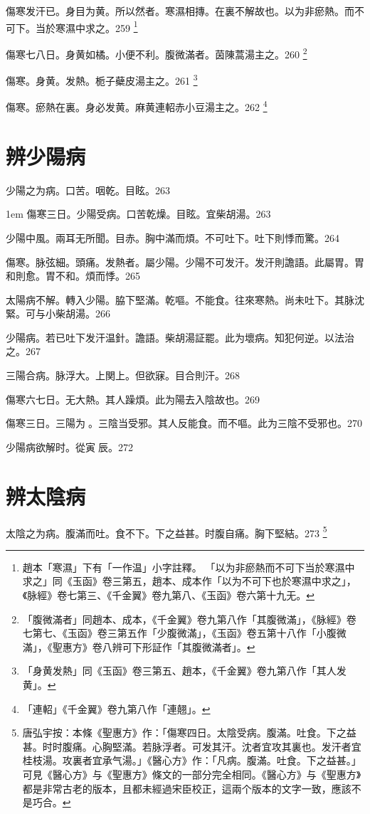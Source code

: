 傷寒发汗已。身目为黄。所以然者。寒濕相摶。在裏不解故也。以为非瘀熱。而不可下。当於寒濕中求之。259
	\footnote{
		趙本「寒濕」下有「一作温」小字註釋。
		「以为非瘀熱而不可下当於寒濕中求之」同《玉函》卷三第五，趙本、成本作「以为不可下也於寒濕中求之」，《脉經》卷七第三、《千金翼》卷九第八、《玉函》卷六第十九无。
	}

傷寒七八日。身黄如橘。小便不利。腹微滿者。茵陳{\khaai 蒿}湯主之。260
	\footnote{
		「腹微滿者」同趙本、成本，《千金翼》卷九第八作「其腹微滿」，《脉經》卷七第七、《玉函》卷三第五作「少腹微滿」，《玉函》卷五第十八作「小腹微滿」，《聖惠方》卷八辨可下形証作「其腹微滿者」。
	}

傷寒。身黄。发熱。栀子蘗皮湯主之。261
	\footnote{
		「身黄发熱」同《玉函》卷三第五、趙本，《千金翼》卷九第八作「其人发黄」。
	}

傷寒。瘀熱在裏。身必发黄。麻黄連軺赤小豆湯主之。262
	\footnote{
		「連軺」《千金翼》卷九第八作「連翹」。
	}

\chapter{辨少陽病}

少陽之为病。口苦。咽乾。目眩。263

\hangindent 1em
傷寒三日。少陽受病。口苦乾燥。目眩。宜柴胡湯。{\shenghui}263

少陽中風。兩耳无所聞。目赤。胸中滿而煩。不可吐下。吐下則悸而驚。264

傷寒。脉弦細。頭痛。发熱者。屬少陽。少陽不可发汗。发汗則譫語。此屬胃。胃和則愈。胃不和。煩而悸。265

太陽病不解。轉入少陽。脇下堅滿。乾嘔。不能食。往來寒熱。尚未吐下。其脉沈緊。可与小柴胡湯。266

{\khaai 少陽病。}若已吐下发汗温針。{\khaai 譫語。}柴胡湯証罷。此为壞病。知犯何逆。以法治之。267

三陽合病。脉浮大。上関上。但欲寐。目合則汗。268

傷寒六七日。无大熱。其人躁煩。此为陽去入陰故也。269

傷寒三日。三陽为{\sungii 𥁞}。三陰当受邪。其人反能食。而不嘔。此为三陰不受邪也。270

少陽病欲解时。從寅{\sungii 𥁞}辰。272

\chapter{辨太陰病}

太陰之为病。腹滿而吐。食不下。下之益甚。时腹自痛。胸下堅結。273
	\footnote{
		唐弘宇按：本條《聖惠方》作：「傷寒四日。太陰受病。腹滿。吐食。下之益甚。时时腹痛。心胸堅滿。若脉浮者。可发其汗。沈者宜攻其裏也。发汗者宜桂枝湯。攻裏者宜承气湯。」《醫心方》作：「凡病。腹滿。吐食。下之益甚。」可見《醫心方》与《聖惠方》條文的一部分完全相同。《醫心方》与《聖惠方》都是非常古老的版本，且都未經過宋臣校正，這兩个版本的文字一致，應該不是巧合。
	}

